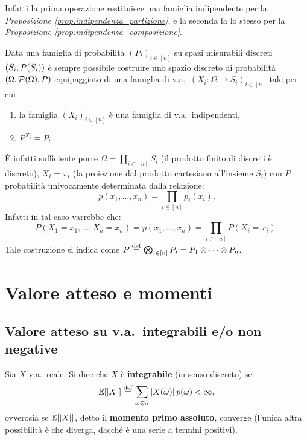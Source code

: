\begin{multicols*}{2}
\begin{remark}
    Infatti la prima operazione restituisce una famiglia indipendente
    per la \textit{Proposizione \ref{prop:indipendenza_partizione}}, e la seconda fa lo stesso
    per la \textit{Proposizione \ref{prop:indipendenza_composizione}}.
\end{remark}

\begin{remark}
    Data una famiglia di probabilità $(P_i)_{i \in [n]}$ su spazi misurabili discreti
    $(S_i, \mathcal{P}(S_i))$ è sempre possibile costruire uno
    spazio discreto di probabilità $(\Omega, \mathcal{P}(\Omega), P)$ equipaggiato di
    una famiglia di v.a.~$(X_i : \Omega \to S_i)_{i \in [n]}$ tale per cui
    \begin{enumerate}
        \item la famiglia $(X_i)_{i \in [n]}$ è una famiglia di v.a.~indipendenti,
        \item $P^{X_i} \equiv P_i$.
    \end{enumerate}
    È infatti sufficiente porre $\Omega = \prod_{i \in [n]} S_i$ (il prodotto finito di discreti è discreto), $X_i = \pi_i$ (la
    proiezione dal prodotto cartesiano all'insieme $S_i$) con $P$ probabilità
    univocamente determinata dalla relazione:
    \[
        p(x_1, \ldots, x_n) = \prod_{i \in [n]} p_i(x_i).
    \]
    Infatti in tal caso varrebbe che:
    \[
        P(X_1 = x_1, \ldots, X_n = x_n) =
        p(x_1, \ldots, x_n) = \prod_{i \in [n]} P(X_i = x_i).
    \]
    Tale costruzione si indica come $P \overset{\mathrm{def}}{=} \bigotimes_{i \in [n]} P_i =
    P_1 \otimes \cdots \otimes P_n$.
\end{remark}

\section{Valore atteso e momenti}

\subsection{Valore atteso su v.a.~integrabili e/o non negative}

\begin{definition}
    Sia $X$ v.a.~reale. Si dice che $X$ è \textbf{integrabile} (in senso discreto)
    se:
    \[
        \mathbb{E}[\left\lvert X \right\rvert] \overset{\mathrm{def}}{=} \sum_{\omega \in \Omega} \left\lvert X(\omega) \right\rvert p(\omega) < \infty,
    \]
    ovverosia se $\mathbb{E}[\left\lvert X \right\rvert]$, detto il \textbf{momento primo assoluto},
    converge (l'unica altra possibilità è che diverga, dacché
    è una serie a termini positivi).    
\end{definition}


\end{multicols*}
